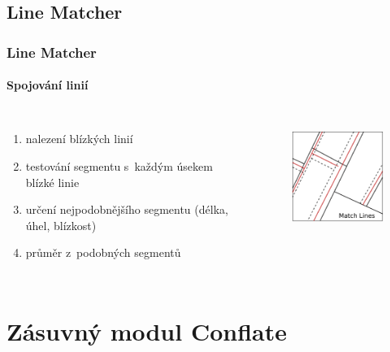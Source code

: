 \documentclass[unicode,bookmarksnumbered]{beamer}
\begin{document}
  \subsection{Line Matcher} %
  \begin{frame}
  \frametitle{Line Matcher}
    \framesubtitle{Spojování linií}
     \begin{columns}[c]
	\column{2in}
	\begin{enumerate}
	    \item nalezení blízkých linií%
	    \item testování segmentu s~každým úsekem blízké linie
	    \item určení nejpodobnějšího segmentu
		  (délka, úhel, blízkost) 
	    \item průměr z~podobných segmentů
	\end{enumerate}
	\column{2in}
	  \begin{figure}
	  \centering
             \includegraphics[width=1.5in]{./pictures/match.pdf}
	  \label{fig:lm-princip}
	  \end{figure}
      \end{columns}
  \end{frame}


\section{Zásuvný modul Conflate}   %
\end{document}
